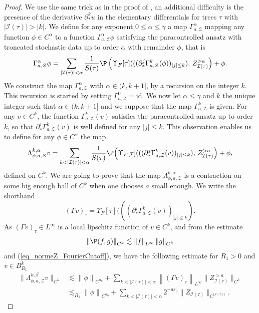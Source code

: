 \documentclass[11pt]{preprint}
\def\id{\mathrm{id}}
\newcommand{\mcI}{\mathcal{I}}
\newcommand{\mcZ}{\mathcal{Z}}
\def\eps{\varepsilon}
\let\eps\varepsilon
\def\eqref#1{(\ref{#1})}
\newcommand{\norme}[1]{\left\lVert #1 \right\lVert}
\begin{document}
	\begin{proof}
		We use the same trick as in the proof of \cite[Lemma 4.12]{AllezChouk}, an additional difficulty is the presence of the derivative $\partial_*^ku$ in the elementary differentials for trees $\tau$ with $|\mcI(\tau)|>|k|$.
		We define for any exponent $0\leq\alpha\leq\gamma$ a map  $	\Gamma^\alpha_{a,\mcZ}$  mapping any function $\phi\in C^\alpha$ to a function  $\Gamma^\alpha_{a,\mcZ}\phi$ satisfying the paracontrolled ansatz with troncated stochastic data up to order $\alpha$ with remainder $\phi$, that is
		\begin{equation}\label{eq_defGamma_beta}
			\Gamma^\alpha_{a,\mcZ} \phi = \sum_{|\mcI(\tau)|<\alpha } \frac{1}{S(\tau)}\P\left( \Upsilon_F[\tau](((\partial^j_*\Gamma_{a,\mcZ}^k(\phi))_{|j|\leq k} ) , \,   Z_{\mcI(\tau)}^{>a}  \right) + \phi.
		\end{equation}
		We construct the map $	\Gamma^\alpha_{a,\mcZ}$ with $\alpha\in (k,k+1]$, by a recursion on the integer $k$. This recursion is started by setting $\Gamma^0_{a,\mcZ}= \id$. We now let $\alpha\leq\gamma$ and $k$ the unique integer such that $\alpha\in (k,k+1]$ and we suppose that the map $\Gamma^k_{a,\mcZ}$ is given. 
		For any $v\in C^{k}$, the function $\Gamma^k_{a,\mcZ}(v)$ satisfies the paracontrolled ansatz up to order $k$, so that $\partial^j_*\Gamma_{a,\mcZ}^k(v)$ is well defined for any $|j|\leq k$. This observation enables us to define for any $\phi \in C^{\alpha}$ the map
		$$
		\Lambda^{k,\alpha}_{\phi,a,\mcZ} v  = \sum_{k<|\mcI(\tau)|<\alpha } \frac{1}{S(\tau)}  \P \Big( \Upsilon_F[\tau](((\partial^j_*\Gamma_{a,\mcZ}^k(v))_{|j|\leq k} ) , \, Z_{\mcI(\tau)}^{>a} \Big) +  \phi,
		$$
		defined on $C^k$. 
		We are going to prove that the map $\Lambda^{k,\alpha}_{\phi,a,\mcZ}$ is a contraction on some big enough ball of $C^k$ when one chooses $a$ small enough. We write the shorthand $$(\Gamma v)_\tau =\Upsilon_F[\tau](((\partial^j_*\Gamma_{a,\mcZ}^k(v))_{|j|\leq k} ).$$ As $(\Gamma v)_\tau\in L^\infty$ is a local lipschitz function of $v\in C^k$, and from the estimate $$\norme{\P(f,g)}_{C^k}\lesssim \norme{f}_{L^\infty}\norme{g}_{C^k}$$ and \eqref{eq_normeZ_FourierCutoff}, we have the following estimate for $R_1>0$ and $v\in B_{R_1}^k$ 
		\begin{align*}
			\lVert \Lambda^{k,\beta}_{\phi,a,\mcZ} v\lVert_{C^{k}} &\lesssim \norme{\phi}_{C^{\alpha_0}} + \sum_{k<|\mcI(\tau)|<\alpha} \norme{(\Gamma v)_\tau}_{L^\infty} \lVert Z_{\mcI(\tau)}^{> a}\lVert_{C^{k}}
			\\
			&\lesssim_{R_1} \norme{\phi}_{C^{\alpha_0}} +  \sum_{k<|\mcI(\tau)|<\alpha }  2^{-a\eps_0}\lVert Z_{\mcI(\tau)}\lVert_{C^{|\mcI(\tau)|}} .

\end{align*}
\end{proof}
\end{document}
